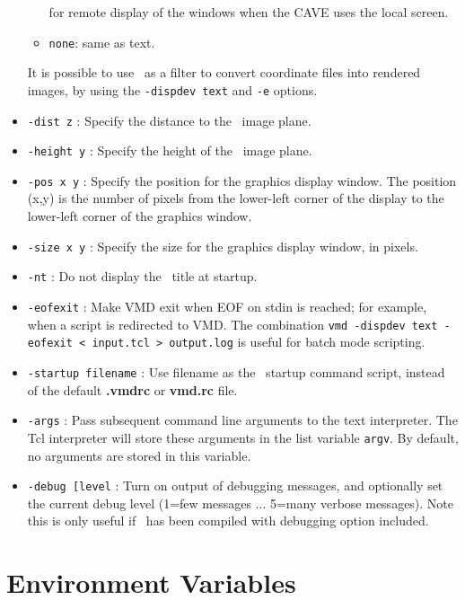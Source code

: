\begin{itemize}
\begin{itemize}
          for remote display of the windows when the CAVE uses the local screen.
       \item {\tt none}: same as text. 
     \end{itemize}
     It is possible to use \VMD\ as a filter to convert coordinate files
     into rendered images, by using the {\tt-dispdev text} and {\tt -e} options.
  \item {\tt -dist z} : 
     Specify the distance to the \VMD\ image plane.
  \item {\tt -height y} : 
     Specify the height of the \VMD\ image plane.
  \item {\tt -pos x y} : 
     Specify the position for the graphics display window. The position
     (x,y) is the number of pixels from the lower-left corner of the
      display to the lower-left corner of the graphics window. 
  \item {\tt -size x y} :
     Specify the size for the graphics display window, in pixels. 
  \item {\tt -nt} :
     Do not display the \VMD\ title at startup. 
  \item {\tt -eofexit} :
     Make VMD exit when EOF on stdin is reached; for example, when a script
       is redirected to VMD.  The combination 
       {\tt vmd -dispdev text -eofexit < input.tcl > output.log} 
       is useful for batch mode scripting.
  \item {\tt -startup filename} :
   Use filename as the \VMD\ startup command script, instead of the
default {\bf .vmdrc} or {\bf vmd.rc} file.
\item {\tt -args} :
  Pass subsequent command line arguments to the text interpreter.  The Tcl
  interpreter will store these arguments in the list variable {\tt argv}.
  By default, no arguments are stored in this variable.
  \item {\tt -debug [level} :
   Turn on output of debugging messages, and optionally set the current debug
   level (1=few messages ... 5=many verbose messages). Note this is only useful
   if \VMD\ has been compiled with debugging option included. 
\end{itemize}

\section{Environment Variables}
\label{ug:exec_env:variables}

